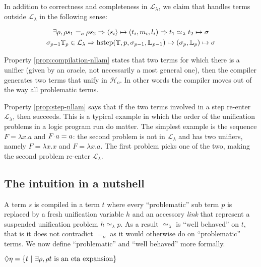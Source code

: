 \documentclass[sigconf,natbib=false,review]{acmart}
\newcommand{\appsep}{\ensuremath{\textcolor{lightgray}{\cdot}}}
\newcommand{\EqualRel}{\ensuremath{=}}
\newcommand{\UnifRel}{\ensuremath{\simeq}}
\newcommand{\Eo}{\ensuremath{\EqualRel_o}\xspace}
\newcommand{\Ue}{\ensuremath{\UnifRel_\lambda}\xspace}
\newcommand{\llambda}{\ensuremath{\mathcal{L}_\lambda}\xspace}
\newcommand{\Ho}{\ensuremath{\mathcal{H}_o}\xspace}
\newcommand{\linkStore}{\ensuremath{\mathbb{L}}\xspace}
\newcommand{\hoUnifPb}{\ensuremath{\mathbb{T}}\xspace}
\begin{document}
\noindent
In addition to correctness and completeness in \llambda, we claim that \hrun
handles terms outside \llambda in the following sense:

\begin{proposition}[Properties of \hrun outside \llambda]
\begin{gather}
  \exists \rho, \rho s_1 \Eo \rho s_2 \Rightarrow
  \C{s_i}{t_i}{m_i}{l_i} \Rightarrow
  t_1 \Ue t_2 \mapsto \sigma \label{prop:compilation-nllam}\\
  \sigma_{p-1} \hoUnifPb_{p} \in \llambda \Rightarrow
  \stepH{\hoUnifPb}{p}{\sigma_{p-1}}{\linkStore_{p-1}}{\sigma_{p}}{\linkStore_p} \mapsto \sigma \label{prop:step-nllam}
\end{gather}
\end{proposition}

\noindent
Property \ref{prop:compilation-nllam} states that two terms for which
there is a unifier (given by an oracle, not necessarily a most general one),
then the compiler generates two terms that unify in \Ho. In other words
the compiler moves out of the way all problematic terms.

Property \ref{prop:step-nllam} says that if the two terms involved in a step
re-enter \llambda, then \hstep succeeds. This is a typical example
in which the order of the unification problems in a logic program run
do matter. The simplest example is the sequence $F = \lambda x.a$ and
$F \appsep a = a$: the second problem is not in \llambda and has two unifiers,
namely $F = \lambda x.x$ and $F = \lambda x.a$. The first problem picks one
of the two, making the second problem re-enter \llambda.

\subsection{The intuition in a nutshell}
\label{sec:nutshell}
A term $s$ is compiled in a term $t$ where every
``problematic'' sub term $p$ is replaced by a fresh unification variable $h$
and an accessory \emph{link} that represent a suspended unification problem
$h \Ue p$. As a result \Ue is ``well behaved'' on $t$, that is it does not
contradict \Eo as it would otherwise do on ``problematic'' terms.
We now define ``problematic'' and ``well behaved'' more formally.

\begin{definition}[\maybeeta]\label{def:maybeeta}
  $\Diamond\eta = \{ t ~|~ \exists \rho, \rho t ~\mathrm{is~an~eta~expansion} \}$
\end{definition}
\end{document}
